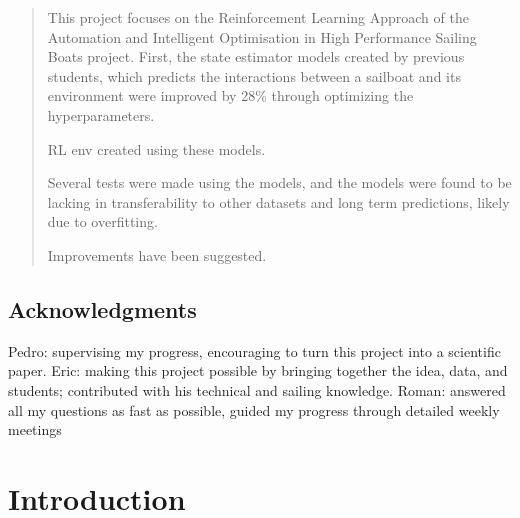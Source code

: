 \documentclass[12pt,twoside]{report}
\date{September 2021}
\begin{document}



\pagestyle{fancy}



\begin{abstract}

This project focuses on the Reinforcement Learning Approach of the Automation and Intelligent Optimisation in High Performance Sailing Boats project. First, the state estimator models created by previous students, which predicts the interactions between a sailboat and its environment were improved by 28\% through optimizing the hyperparameters. 

RL env created using these models.

Several tests were made using the models, and the models were found to be lacking in transferability to other datasets and long term predictions, likely due to overfitting.

Improvements have been suggested.

\end{abstract}

\section*{Acknowledgments}
Pedro: supervising my progress, encouraging to turn this project into a scientific paper.
Eric: making this project possible by bringing together the idea, data, and students; contributed with his technical and sailing knowledge.
Roman: answered all my questions as fast as possible, guided my progress through detailed weekly meetings


\clearpage{\pagestyle{empty}\cleardoublepage}


\tableofcontents 


\clearpage{\pagestyle{empty}%
}
\fancyhead[LE,RO]{\slshape \rightmark}
\fancyhead[LO,RE]{\slshape \leftmark}


\chapter{Introduction}
\end{document}
